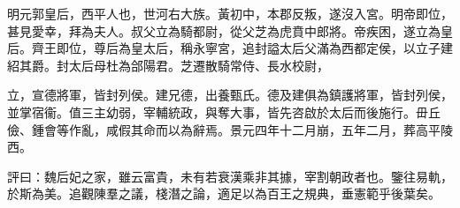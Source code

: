 \begin{pinyinscope}
 
 
 明元郭皇后，西平人也，世河右大族。黃初中，本郡反叛，遂沒入宮。明帝即位，甚見愛幸，拜為夫人。叔父立為騎都尉，從父芝為虎賁中郎將。帝疾困，遂立為皇后。齊王即位，尊后為皇太后，稱永寧宮，追封謚太后父滿為西都定侯，以立子建紹其爵。封太后母杜為郃陽君。芝遷散騎常侍、長水校尉，
 
 
 立，宣德將軍，皆封列侯。建兄德，出養甄氏。德及建俱為鎮護將軍，皆封列侯，並掌宿衞。值三主幼弱，宰輔統政，與奪大事，皆先咨啟於太后而後施行。毌丘儉、鍾會等作亂，咸假其命而以為辭焉。景元四年十二月崩，五年二月，葬高平陵西。
 
 
 
 
 評曰：魏后妃之家，雖云富貴，未有若衰漢乘非其據，宰割朝政者也。鑒往易軌，於斯為美。追觀陳羣之議，棧潛之論，適足以為百王之規典，垂憲範乎後葉矣。
 
 
\end{pinyinscope}